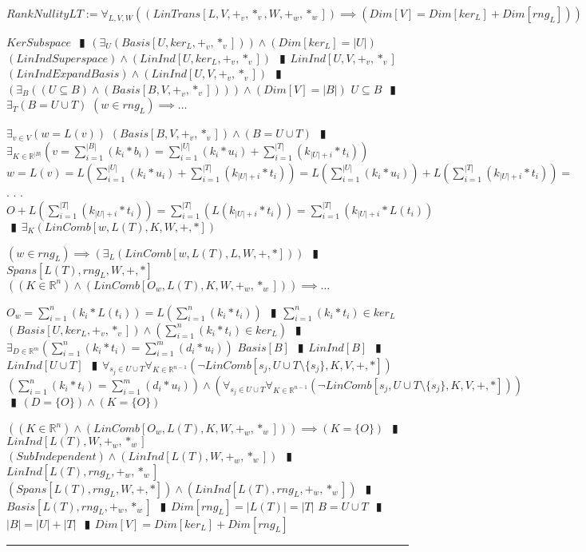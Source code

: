 \documentclass{book}
\newcommand{\abr}{:=}
\newcommand{\cont}{\phantom{.}. . .\phantom{.}}
\newcommand{\pipe}{$\phantom{(}\vrectangleblack\phantom{)}$}
\begin{document}
$RankNullityLT \abr \forall_{L, V, W}((LinTrans[L, V, +_v, *_v, W, +_w, *_w]) \implies (Dim[V] = Dim[ker_L] + Dim[rng_L]))$
\begin{enumerate}
  \lit $KerSubspace$ \pipe $(\exists_{U}(Basis[U, ker_L, +_v, *_v])) \land (Dim[ker_L] = |U|)$
  \lit $(LinIndSuperspace) \land (LinInd[U, ker_L, +_v, *_v])$ \pipe $LinInd[U, V, +_v, *_v]$
  \lit $(LinIndExpandBasis) \land (LinInd[U, V, +_v, *_v])$ \pipe $(\exists_{B}((U \subseteq B)\land (Basis[B, V, +_v, *_v]))) \land (Dim[V] = |B|)$
  \lit $U \subseteq B$ \pipe $\exists_{T}(B = U \cup T)$
  \lit $(w \in rng_L) \implies \ldots$
  \begin{enumerate}
    \lit $\exists_{v \in V}(w = L(v))$
    \lit $(Basis[B, V, +_v, *_v]) \land (B = U \cup T)$ \pipe $\exists_{K \in \mathbb{R}^{|B|}}(v = \sum_{i = 1}^{|B|}(k_i * b_i) = \sum_{i = 1}^{|U|}(k_i * u_i) + \sum_{i = 1}^{|T|}(k_{|U| + i} * t_i))$
    \lit $w = L(v) = L(\sum_{i = 1}^{|U|}(k_i * u_i) + \sum_{i = 1}^{|T|}(k_{|U| + i} * t_i)) = L(\sum_{i = 1}^{|U|}(k_i * u_i)) + L(\sum_{i = 1}^{|T|}(k_{|U| + i} * t_i)) =$ \cont
    \lit $O + L(\sum_{i = 1}^{|T|}(k_{|U| + i} * t_i)) = \sum_{i = 1}^{|T|}(L(k_{|U| + i} * t_i)) = \sum_{i = 1}^{|T|}(k_{|U| + i} * L(t_i))$ \pipe $\exists_{K}(LinComb[w, L(T), K, W, +, *])$
  \end{enumerate}
  \lit $(w \in rng_L) \implies (\exists_{L}(LinComb[w, L(T), L, W, +, *]))$ \pipe $Spans[L(T), rng_L, W, +, *]$
  \lit $((K \in \mathbb{R}^n) \land (LinComb[O_w, L(T), K, W, +_w, *_w])) \implies \ldots$
  \begin{enumerate}
    \lit $O_w = \sum_{i = 1}^{n}(k_i * L(t_i)) = L(\sum_{i = 1}^{n}(k_i * t_i))$ \pipe $\sum_{i = 1}^{n}(k_i * t_i) \in ker_L$ 
    \lit $(Basis[U, ker_L, +_v, *_v]) \land (\sum_{i = 1}^{n}(k_i * t_i) \in ker_L)$ \pipe $\exists_{D \in \mathbb{R}^m}(\sum_{i = 1}^{n}(k_i * t_i) = \sum_{i = 1}^{m}(d_i * u_i))$
    \lit $Basis[B]$ \pipe $LinInd[B]$ \pipe $LinInd[U \cup T]$ \pipe $\forall_{s_j \in U \cup T} \forall_{K \in \mathbb{R}^{n - 1}}(\lnot LinComb[s_j, U \cup T \setminus \{s_j\}, K, V, +, *])$
    \lit $(\sum_{i = 1}^{n}(k_i * t_i) = \sum_{i = 1}^{m}(d_i * u_i)) \land (\forall_{s_j \in U \cup T} \forall_{K \in \mathbb{R}^{n - 1}}(\lnot LinComb[s_j, U \cup T \setminus \{s_j\}, K, V, +, *]))$ \pipe $(D = \{O\}) \land (K = \{O\})$
  \end{enumerate}
  \lit $((K \in \mathbb{R}^n) \land (LinComb[O_w, L(T), K, W, +_w, *_w])) \implies (K = \{O\})$ \pipe $LinInd[L(T), W, +_w, *_w]$
  \lit $(SubIndependent) \land (LinInd[L(T), W, +_w, *_w])$ \pipe $LinInd[L(T), rng_L, +_w, *_w]$
  \lit $(Spans[L(T), rng_L, W, +, *]) \land (LinInd[L(T), rng_L, +_w, *_w])$ \pipe $Basis[L(T), rng_L, +_w, *_w]$ \pipe $Dim[rng_L] = |L(T)| = |T|$
  \lit $B = U \cup T$ \pipe $|B| = |U| + |T|$ \pipe $Dim[V] = Dim[ker_L] + Dim[rng_L]$
\end{enumerate} \vspace{.75mm} \hrule \vspace{.75mm} \ \\ 
\end{document}
